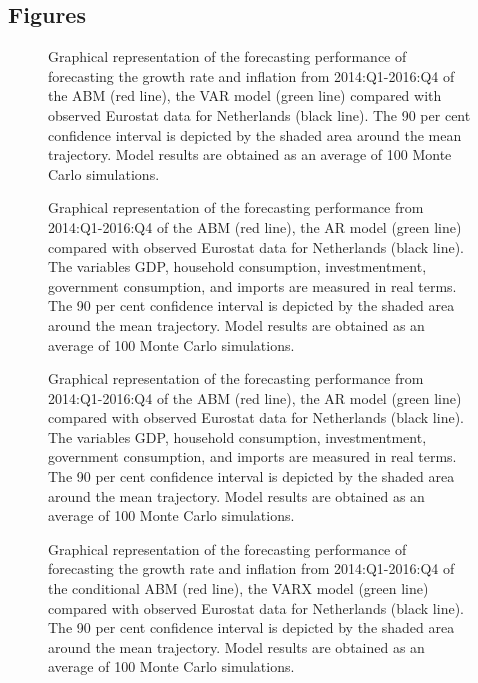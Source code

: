 \subsection{Figures}
\begin{figure}[!h]
	\centering
	
 \caption{ Graphical representation of the forecasting performance of forecasting the growth rate and inflation from 2014:Q1-2016:Q4 of the ABM (red line), the VAR model (green line) compared with observed Eurostat data for Netherlands (black line). The 90 per cent confidence interval is depicted by the shaded area around the mean trajectory. Model results are obtained as an average of 100 Monte Carlo simulations.}
   \label{fig:gvamacro_growthinflation_yq}
\end{figure}

\begin{figure}[!h]
	\centering
	
	\caption{Graphical representation of the forecasting performance from 2014:Q1-2016:Q4 of the ABM (red line), the AR model (green line) compared with observed Eurostat data for Netherlands (black line). The variables GDP, household consumption, investmentment, government consumption, and imports are measured in real terms. The 90 per cent confidence interval is depicted by the shaded area around the mean trajectory. Model results are obtained as an average of 100 Monte Carlo simulations.}     \label{fig:gvamacro_gvaetal_y}
\end{figure}

\begin{figure}[!h]
	\centering
	
 \caption{Graphical representation of the forecasting performance from 2014:Q1-2016:Q4 of the ABM (red line), the AR model (green line) compared with observed Eurostat data for Netherlands (black line). The variables GDP, household consumption, investmentment, government consumption, and imports are measured in real terms. The 90 per cent confidence interval is depicted by the shaded area around the mean trajectory. Model results are obtained as an average of 100 Monte Carlo simulations.}
  \label{fig:gvamacro_gvaetal_y}
\end{figure}

\begin{figure}[!h]
	\centering
	
 \caption{ Graphical representation of the forecasting performance of forecasting the growth rate and inflation from 2014:Q1-2016:Q4 of the conditional ABM (red line), the VARX model (green line) compared with observed Eurostat data for Netherlands (black line). The 90 per cent confidence interval is depicted by the shaded area around the mean trajectory. Model results are obtained as an average of 100 Monte Carlo simulations.}
   \label{fig:gvamacro_growthinflation_yq}
\end{figure}

